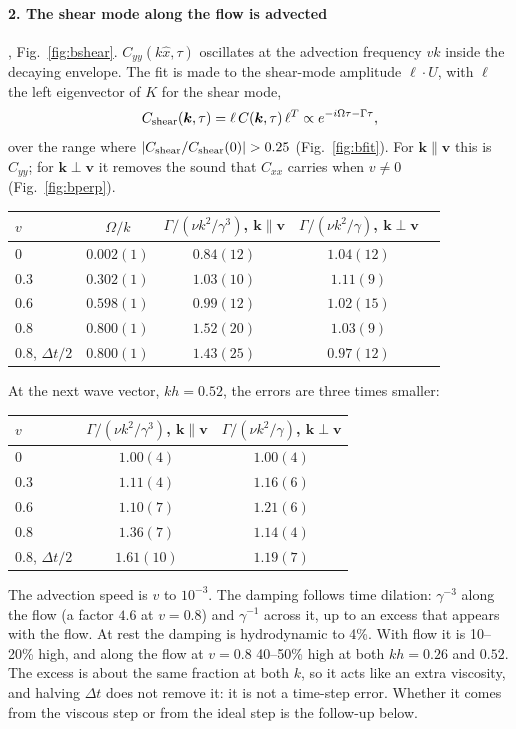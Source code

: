 \documentclass[11pt,aps,preprint,nofootinbib,superscriptaddress,tightenlines]{revtex4-2}
\def\Fig#1{Fig.~\ref{#1}}
\let\oldparagraph\paragraph
\renewcommand{\paragraph}{\par\bigskip\oldparagraph}
\begin{document}
\paragraph{2. The shear mode along the flow is advected}, \Fig{fig:bshear}.  $C_{yy}(k\hat x,\tau)$
oscillates at the advection frequency $vk$ inside the decaying envelope.  The fit is made to the
shear-mode amplitude $\ell\cdot U$, with $\ell$ the left eigenvector of $K$ for the shear mode,
\begin{equation}
C_{\rm shear}(\bm k,\tau)=\ell\, C(\bm k,\tau)\,\ell^{T}\propto e^{-i\Omega\tau-\Gamma\tau},
\end{equation}
over the range where $|C_{\rm shear}/C_{\rm shear}(0)|>0.25$ (\Fig{fig:bfit}).  For $\bm k\parallel\bm v$ this is $C_{yy}$;
for $\bm k\perp\bm v$ it removes the sound that $C_{xx}$ carries when $v\neq0$ (\Fig{fig:bperp}).
\begin{center}
\begin{tabular}{lcccc}
\hline
$v$ & $\Omega/k$ & $\Gamma/(\nu k^2/\gamma^3)$, $\bm k\parallel\bm v$ & $\Gamma/(\nu k^2/\gamma)$, $\bm k\perp\bm v$ \\ \hline
0 & $0.002(1)$ & $0.84(12)$ & $1.04(12)$ \\
0.3 & $0.302(1)$ & $1.03(10)$ & $1.11(9)$ \\
0.6 & $0.598(1)$ & $0.99(12)$ & $1.02(15)$ \\
0.8 & $0.800(1)$ & $1.52(20)$ & $1.03(9)$ \\
0.8, $\Delta t/2$ & $0.800(1)$ & $1.43(25)$ & $0.97(12)$ \\
\hline
\end{tabular}
\end{center}
At the next wave vector, $kh=0.52$, the errors are three times smaller:
\begin{center}
\begin{tabular}{lcc}
\hline
$v$ & $\Gamma/(\nu k^2/\gamma^3)$, $\bm k\parallel\bm v$ & $\Gamma/(\nu k^2/\gamma)$, $\bm k\perp\bm v$ \\ \hline
0 & $1.00(4)$ & $1.00(4)$ \\
0.3 & $1.11(4)$ & $1.16(6)$ \\
0.6 & $1.10(7)$ & $1.21(6)$ \\
0.8 & $1.36(7)$ & $1.14(4)$ \\
0.8, $\Delta t/2$ & $1.61(10)$ & $1.19(7)$ \\
\hline
\end{tabular}
\end{center}
The advection speed is $v$ to $10^{-3}$.  The damping follows time dilation: $\gamma^{-3}$ along the flow
(a factor $4.6$ at $v=0.8$) and $\gamma^{-1}$ across it, up to an excess that appears with the flow.  At rest
the damping is hydrodynamic to 4\%.  With flow it is 10--20\% high, and along the flow at $v=0.8$
40--50\% high at both $kh=0.26$ and $0.52$.  The excess is about the same fraction at both $k$, so it acts
like an extra viscosity, and halving $\Delta t$ does not remove it: it is not a time-step error.  Whether
it comes from the viscous step or from the ideal step is the follow-up below.
\end{document}
